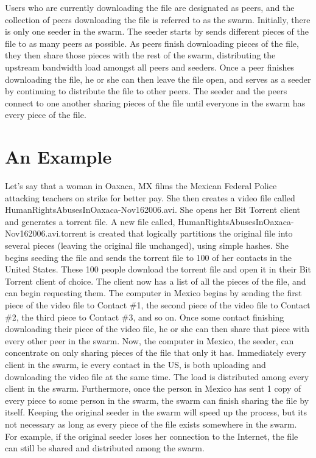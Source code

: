 \documentclass[a4paper,12pt]{report}
\begin{document}
Users who are currently downloading the file are designated as peers, and the collection of peers downloading the file is referred to as the swarm.
Initially, there is only one seeder in the swarm.
The seeder starts by sends different pieces of the file to as many peers as possible. 
As peers finish downloading pieces of the file, they then share those pieces with the rest of the swarm, distributing the upstream bandwidth load amongst all peers and seeders. 
Once a peer finishes downloading the file, he or she can then leave the file open, and serves as a seeder by continuing to distribute the file to other peers.
The seeder and the peers connect to one another sharing pieces of the file until everyone in the swarm has every piece of the file.

\section{An Example}
Let's say that a woman in Oaxaca, MX films the Mexican Federal Police attacking teachers on strike for better pay.
She then creates a video file called HumanRightsAbusesInOaxaca-Nov162006.avi. She opens her Bit Torrent client and generates a torrent file.
A new file called, HumanRightsAbusesInOaxaca-Nov162006.avi.torrent is created that logically partitions the original file into several pieces (leaving the original file unchanged), using simple hashes.
She begins seeding the file and sends the torrent file to 100 of her contacts in the United States.
These 100 people download the torrent file and open it in their Bit Torrent client of choice.
The client now has a list of all the pieces of the file, and can begin requesting them.
The computer in Mexico begins by sending the first piece of the video file to Contact \#1, the second piece of the video file to Contact \#2, the third piece to Contact \#3, and so on.
Once some contact finishing downloading their piece of the video file, he or she can then share that piece with every other peer in the swarm.
Now, the computer in Mexico, the seeder, can concentrate on only sharing pieces of the file that only it has.
Immediately every client in the swarm, ie every contact in the US, is both uploading and downloading the video file at the same time.
The load is distributed among every client in the swarm.
Furthermore, once the person in Mexico has sent 1 copy of every piece to some person in the swarm, the swarm can finish sharing the file by itself.
Keeping the original seeder in the swarm will speed up the process, but its not necessary as long as every piece of the file exists somewhere in the swarm.
For example, if the original seeder loses her connection to the Internet, the file can still be shared and distributed among the swarm.
\end{document}
